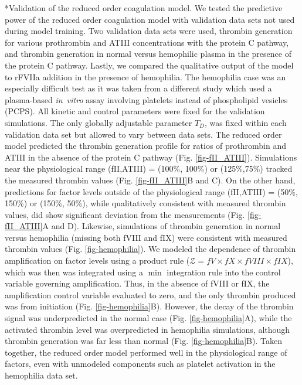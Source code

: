 \documentclass[12pt]{article}
\makeatletter
\renewcommand\subsection{\@startsection
	{subsection}{2}{0mm}
	{-0.05in}
	{-0.5\baselineskip}
	{\normalfont\normalsize\bfseries}}
\makeatother
\begin{document}
\subsection*{Validation of the reduced order coagulation model.}
We tested the predictive power of the reduced order coagulation model with validation data sets not used during model training. 
Two validation data sets were used, thrombin generation for various prothrombin and ATIII concentrations with the protein C pathway, 
and thrombin generation in normal versus hemophilic plasma in the presence of the protein C pathway. 
Lastly, we compared the qualitative output of the model to rFVIIa addition in the presence of hemophilia.
The hemophilia case was an especially difficult test as it was taken from a different study which used a plasma-based
\textit{in~vitro} assay involving platelets instead of phospholipid vesicles (PCPS). 
All kinetic and control parameters were fixed for the validation simulations. 
The only globally adjustable parameter $T_{D}$, was fixed within each validation data set but allowed to vary between data sets.
The reduced order model predicted the thrombin generation profile for ratios of prothrombin and ATIII in the absence of the protein C pathway (Fig. \ref{fig-fII_ATIII}).
Simulations near the physiological range (fII,ATIII) = (100\%, 100\%) or (125\%,75\%) tracked the measured thrombin values (Fig. \ref{fig-fII_ATIII}B and C).
On the other hand, predictions for factor levels outside of the physiological range (fII,ATIII) = (50\%, 150\%) or (150\%, 50\%), while qualitatively consistent with measured thrombin values, did show significant 
deviation from the measurements (Fig. \ref{fig-fII_ATIII}A and D).
Likewise, simulations of thrombin generation in normal versus hemophilia (missing both fVIII and fIX) were consistent with measured thrombin values (Fig. \ref{fig-hemophilia}).
We modeled the dependence of thrombin amplification on factor levels using a product rule ($\mathcal{Z} = fV\times fX\times fVIII\times fIX$), 
which was then was integrated using a $\min$ integration rule into the control variable governing amplification. 
Thus, in the absence of fVIII or fIX, the amplification control variable evaluated to zero, and the only thrombin produced was from initiation (Fig. \ref{fig-hemophilia}B).
However, the decay of the thrombin signal was underpredicted in the normal case (Fig. \ref{fig-hemophilia}A), while the activated thrombin level was overpredicted 
in hemophilia simulations, although thrombin generation was far less than normal (Fig. \ref{fig-hemophilia}B). 
Taken together, the reduced order model performed well in the physiological range of factors, even with
unmodeled components such as platelet activation in the hemophilia data set. 
\end{document}
